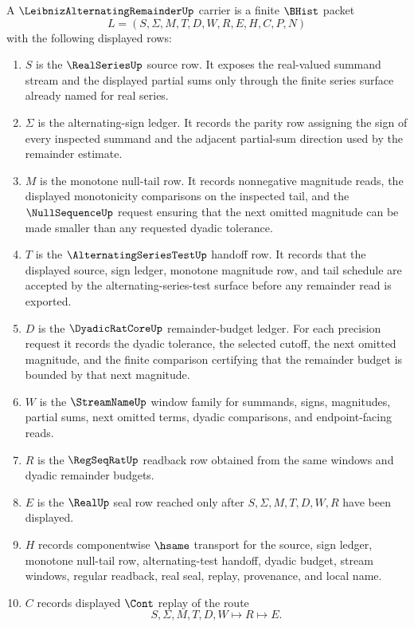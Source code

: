 \begin{definition}
\label{def:leibniz-alternating-remainder-carrier}
A $\LeibnizAlternatingRemainderUp$ carrier is a finite $\BHist$ packet
$$
L=(S,\Sigma,M,T,D,W,R,E,H,C,P,N)
$$
with the following displayed rows:
\begin{enumerate}
\item $S$ is the $\RealSeriesUp$ source row. It exposes the real-valued summand stream and the displayed partial sums only through the finite series surface already named for real series.
\item $\Sigma$ is the alternating-sign ledger. It records the parity row assigning the sign of every inspected summand and the adjacent partial-sum direction used by the remainder estimate.
\item $M$ is the monotone null-tail row. It records nonnegative magnitude reads, the displayed monotonicity comparisons on the inspected tail, and the $\NullSequenceUp$ request ensuring that the next omitted magnitude can be made smaller than any requested dyadic tolerance.
\item $T$ is the $\AlternatingSeriesTestUp$ handoff row. It records that the displayed source, sign ledger, monotone magnitude row, and tail schedule are accepted by the alternating-series-test surface before any remainder read is exported.
\item $D$ is the $\DyadicRatCoreUp$ remainder-budget ledger. For each precision request it records the dyadic tolerance, the selected cutoff, the next omitted magnitude, and the finite comparison certifying that the remainder budget is bounded by that next magnitude.
\item $W$ is the $\StreamNameUp$ window family for summands, signs, magnitudes, partial sums, next omitted terms, dyadic comparisons, and endpoint-facing reads.
\item $R$ is the $\RegSeqRatUp$ readback row obtained from the same windows and dyadic remainder budgets.
\item $E$ is the $\RealUp$ seal row reached only after $S,\Sigma,M,T,D,W,R$ have been displayed.
\item $H$ records componentwise $\hsame$ transport for the source, sign ledger, monotone null-tail row, alternating-test handoff, dyadic budget, stream windows, regular readback, real seal, replay, provenance, and local name.
\item $C$ records displayed $\Cont$ replay of the route
$$
S,\Sigma,M,T,D,W \longmapsto R \longmapsto E .
$$
\end{enumerate}
\end{definition}
